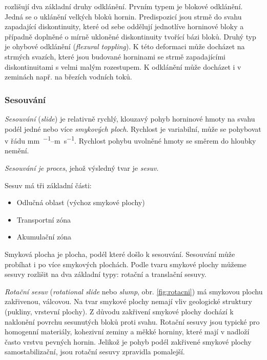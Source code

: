 \textcite{goodmanTopplingRockSlopes1976} rozlišují dva základní druhy odklánění. Prvním typem je blokové odklánění. Jedná se o uklánění velkých bloků hornin. Predispozicí jsou strmě do svahu zapadající diskontinuity, které od sebe oddělují jednotlíve horninové bloky a případně doplněné o mírně ukloněné diskontinuity tvořící bázi bloků. Druhý typ je ohybové odklánění (\textit{flexural toppling}). K této deformaci může docházet na strmých svazích, které jsou budované horninami se strmě zapadajícími diskontinuitami s velmi malým rozestupem. K odklánění může docházet i v zeminách např. na březích vodních toků.

\subsubsection{Sesouvání}
\emph{Sesouvání} (\textit{slide}) je relativně rychlý, klouzavý pohyb horninové hmoty na svahu podél jedné nebo více \emph{smykových ploch}. Rychlost je variabilní, může se pohybovat v řádu \si{\milli\metre\per\rok}--\si{\metre\per\second}. Rychlost pohybu uvolněné hmoty se směrem do hloubky nemění.

\emph{Sesouvání je proces}, jehož výsledný tvar je \emph{sesuv}.

Sesuv má tři základní části: 
\begin{itemize}
	\item Odlučná oblast (výchoz smykové plochy)
	\item Transportní zóna
	\item Akumulační zóna
\end{itemize}

Smyková plocha je plocha, podél které došlo k sesouvání. Sesouvání může probíhat i po více smykových plochách. Podle tvaru smykové plochy můžeme sesuvy rozlišit na dva základní typy: rotační a translační sesuvy.

\emph{Rotační sesuv} (\textit{rotational slide} nebo \textit{slump}, obr. \ref{fig:rotacni}) má smykovou plochu zakřivenou, válcovou. Na tvar smykové plochy nemají vliv geologické struktury (pukliny, vrstevní plochy). Z důvodu zakřivení smykové plochy dochází k naklonění povrchu sesunutých bloků proti svahu. Rotační sesuvy jsou typické pro homogenní materiály, kohezivní zeminy a měkké horniny, které mají v nadloží často vrstvu pevných hornin. Jelikož je pohyb podél zakřivené smykové plochy samostabilizační, jsou rotační sesuvy zpravidla pomalejší.

